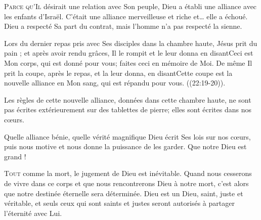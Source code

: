 

\lettrine{P}{arce qu'Il} désirait une relation avec Son peuple,
 Dieu a établi une alliance avec les enfants d'Israël.
 C'était une alliance merveilleuse et riche et\dots{} elle a échoué.
 Dieu a respecté Sa part du contrat, mais l'homme n'a pas respecté la sienne. 


Lors du dernier repas pris avec Ses disciples dans la chambre haute,
 Jésus \Og prit du pain ; et après avoir rendu grâces, Il le rompit
 et le leur donna en disant\frcolon Ceci est Mon corps, qui est donné pour vous;
 faites ceci en mémoire de Moi. De même Il prit la coupe, après le repas,
 et la leur donna, en disant\frcolon Cette coupe est la nouvelle alliance
 en Mon sang, qui est répandu pour vous. \Fg{} ((22:19-20)). 

Les règles de cette nouvelle alliance, données dans cette chambre haute,
 ne sont pas écrites extérieurement sur des tablettes de pierre;
 elles sont écrites dans nos c\oe{}urs. 

Quelle alliance bénie, quelle vérité magnifique\frcolon
 Dieu écrit Ses lois sur nos c\oe{}urs, puis nous motive et nous donne
 la puissance de les garder. Que notre Dieu est grand ! 

\dvrule






\lettrine{T}{out} comme la mort, le jugement de Dieu est inévitable.
 Quand nous cesserons de vivre dans ce corps et que nous rencontrerons
 Dieu à notre mort, c'est alors que notre destinée éternelle
 sera déterminée. Dieu est un Dieu, saint, juste et véritable,
 et seuls ceux qui sont saints et justes seront autorisés
 à partager l'éternité avec Lui. 

